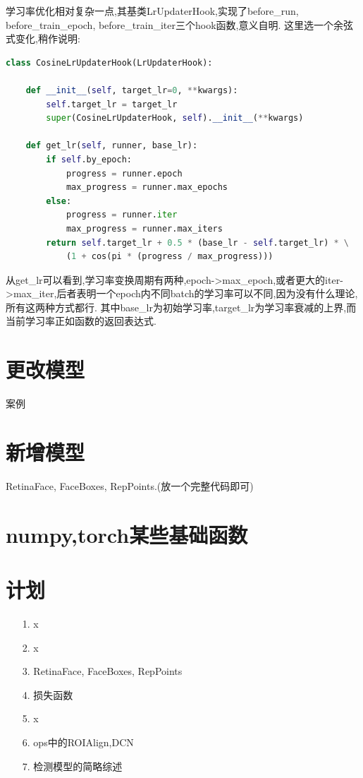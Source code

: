 \documentclass[UTF8]{ctexart}
\begin{document}
学习率优化相对复杂一点,其基类LrUpdaterHook,实现了before\_run, before\_train\_epoch, before\_train\_iter三个hook函数,意义自明.
这里选一个余弦式变化,稍作说明:

\lstset{style=mystyle}
\begin{lstlisting}[language=Python]
class CosineLrUpdaterHook(LrUpdaterHook):

    def __init__(self, target_lr=0, **kwargs):
        self.target_lr = target_lr
        super(CosineLrUpdaterHook, self).__init__(**kwargs)

    def get_lr(self, runner, base_lr):
        if self.by_epoch:
            progress = runner.epoch
            max_progress = runner.max_epochs
        else:
            progress = runner.iter
            max_progress = runner.max_iters
        return self.target_lr + 0.5 * (base_lr - self.target_lr) * \
			(1 + cos(pi * (progress / max_progress)))
\end{lstlisting}
从get\_lr可以看到,学习率变换周期有两种,epoch->max\_epoch,或者更大的iter->max\_iter,后者表明一个epoch内不同batch的学习率可以不同,因为没有什么理论,所有这两种方式都行.
其中base\_lr为初始学习率,target\_lr为学习率衰减的上界,而当前学习率正如函数的返回表达式.

\section{更改模型}
案例

\section{新增模型}
RetinaFace, FaceBoxes, RepPoints.(放一个完整代码即可)

\section{numpy,torch某些基础函数}
\label{sec:basefunc}

\section{计划}
\begin{itemize}
	\item[1.] x
	\item[2.] x
	\item [3.] RetinaFace, FaceBoxes, RepPoints
	\item [4.] 损失函数
	\item [5.] x
	\item [6.] ops中的ROIAlign,DCN
	\item [7.] 检测模型的简略综述
\end{itemize}
\end{document}
